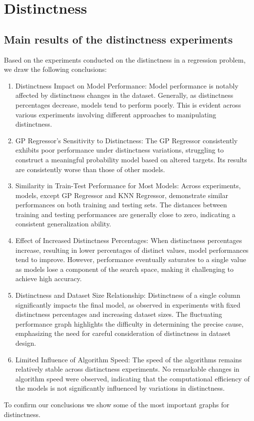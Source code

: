 \documentclass{Configuration_Files/PoliMi3i_thesis}
\begin{document}
\newpage
\newpage
\section{Distinctness}
\label{sec:section_4_2}%

\subsection{Main results of the distinctness experiments}
\label{subsec:section_4_2_1}%

Based on the experiments conducted on the distinctness in a regression problem, we draw the following conclusions:
\begin{enumerate}
    \item Distinctness Impact on Model Performance:
        Model performance is notably affected by distinctness changes in the dataset. Generally, as distinctness percentages decrease, models tend to perform poorly. This is evident across various experiments involving different approaches to manipulating distinctness.
    \item GP Regressor's Sensitivity to Distinctness:
        The GP Regressor consistently exhibits poor performance under distinctness variations, struggling to construct a meaningful probability model based on altered targets. Its results are consistently worse than those of other models.
    \item Similarity in Train-Test Performance for Most Models:
        Across experiments, models, except GP Regressor and KNN Regressor, demonstrate similar performances on both training and testing sets. The distances between training and testing performances are generally close to zero, indicating a consistent generalization ability.
    \item Effect of Increased Distinctness Percentages:
        When distinctness percentages increase, resulting in lower percentages of distinct values, model performances tend to improve. However, performance eventually saturates to a single value as models lose a component of the search space, making it challenging to achieve high accuracy.
    \item Distinctness and Dataset Size Relationship:
        Distinctness of a single column significantly impacts the final model, as observed in experiments with fixed distinctness percentages and increasing dataset sizes. The fluctuating performance graph highlights the difficulty in determining the precise cause, emphasizing the need for careful consideration of distinctness in dataset design.
    \item Limited Influence of Algorithm Speed:
        The speed of the algorithms remains relatively stable across distinctness experiments. No remarkable changes in algorithm speed were observed, indicating that the computational efficiency of the models is not significantly influenced by variations in distinctness.
\end{enumerate}
To confirm our conclusions we show some of the most important graphs for distinctness.
\end{document}
